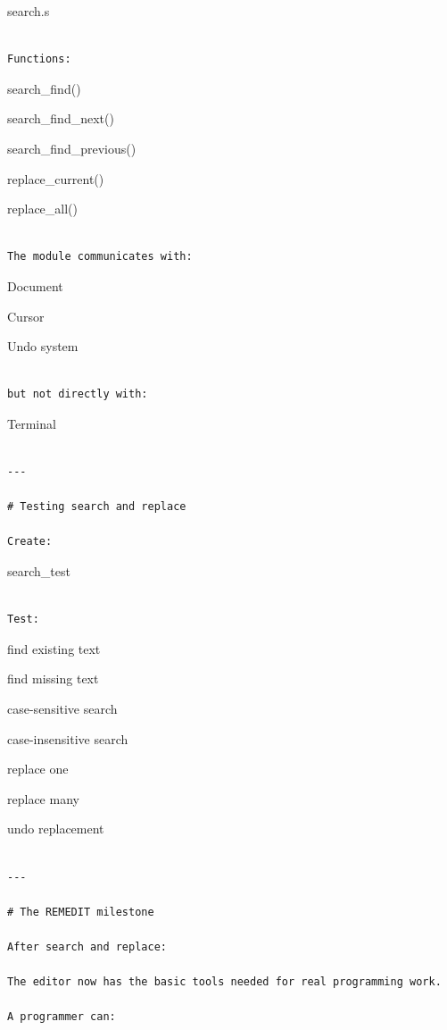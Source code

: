 \documentclass[
  oneside,
  openany]{book}
\begin{document}
search.s

\begin{verbatim}

Functions:
\end{verbatim}

search\_find()

search\_find\_next()

search\_find\_previous()

replace\_current()

replace\_all()

\begin{verbatim}

The module communicates with:
\end{verbatim}

Document

Cursor

Undo system

\begin{verbatim}

but not directly with:
\end{verbatim}

Terminal

\begin{verbatim}

---

# Testing search and replace

Create:
\end{verbatim}

search\_test

\begin{verbatim}

Test:
\end{verbatim}

find existing text

find missing text

case-sensitive search

case-insensitive search

replace one

replace many

undo replacement

\begin{verbatim}

---

# The REMEDIT milestone

After search and replace:

The editor now has the basic tools needed for real programming work.

A programmer can:
\end{verbatim}
\end{document}
